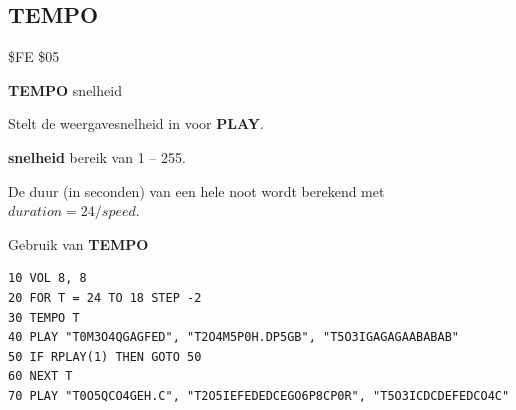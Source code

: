 \subsection{TEMPO}
\begin{description}[leftmargin=2cm,style=nextline]
\item [Token:]    \$FE \$05

\item [Formaat:]   {\bf TEMPO} snelheid

\item [Gebruik:]    Stelt de weergavesnelheid in voor {\bf PLAY}.

                  {\bf snelheid} bereik van 1 -- 255.

                  De duur (in seconden) van een hele noot wordt berekend met $duration = 24 / speed$.

\item [Voorbeeld:]  Gebruik van {\bf TEMPO}

\begin{tcolorbox}[colback=black,coltext=white]
\verbatimfont{\codefont}
\begin{verbatim}
10 VOL 8, 8
20 FOR T = 24 TO 18 STEP -2
30 TEMPO T
40 PLAY "T0M3O4QGAGFED", "T2O4M5P0H.DP5GB", "T5O3IGAGAGAABABAB"
50 IF RPLAY(1) THEN GOTO 50
60 NEXT T
70 PLAY "T0O5QCO4GEH.C", "T2O5IEFEDEDCEGO6P8CP0R", "T5O3ICDCDEFEDCO4C"
\end{verbatim}
\end{tcolorbox}
\end{description}


\newpage
